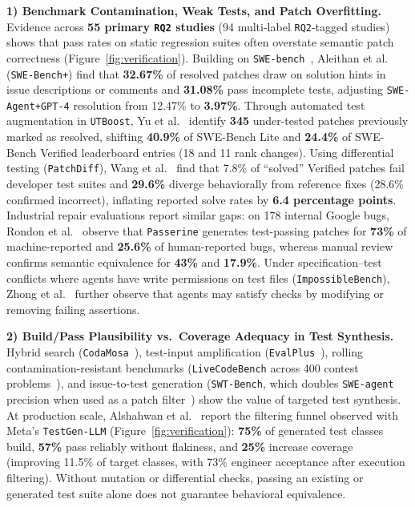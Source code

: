 \documentclass[10pt,twocolumn,a4paper]{article}
\begin{document}
\textbf{1) Benchmark Contamination, Weak Tests, and Patch Overfitting.} Evidence across \textbf{55 primary \texttt{RQ2} studies} (94 multi-label \texttt{RQ2}-tagged studies) shows that pass rates on static regression suites often overstate semantic patch correctness (Figure~\ref{fig:verification}). Building on \texttt{SWE-bench}~\cite{jimenez2024swebench}, Aleithan et al.~\cite{aleithan2026swebench} (\texttt{SWE-Bench+}) find that \textbf{32.67\%} of resolved patches draw on solution hints in issue descriptions or comments and \textbf{31.08\%} pass incomplete tests, adjusting \texttt{SWE-Agent+GPT-4} resolution from 12.47\% to \textbf{3.97\%}. Through automated test augmentation in \texttt{UTBoost}, Yu et al.~\cite{yu2025utboost} identify \textbf{345} under-tested patches previously marked as resolved, shifting \textbf{40.9\%} of SWE-Bench Lite and \textbf{24.4\%} of SWE-Bench Verified leaderboard entries (18 and 11 rank changes). Using differential testing (\texttt{PatchDiff}), Wang et al.~\cite{wang2025solved} find that 7.8\% of ``solved'' Verified patches fail developer test suites and \textbf{29.6\%} diverge behaviorally from reference fixes (28.6\% confirmed incorrect), inflating reported solve rates by \textbf{6.4 percentage points}. Industrial repair evaluations report similar gaps: on 178 internal Google bugs, Rondon et al.~\cite{rondon2025evaluating} observe that \texttt{Passerine} generates test-passing patches for \textbf{73\%} of machine-reported and \textbf{25.6\%} of human-reported bugs, whereas manual review confirms semantic equivalence for \textbf{43\%} and \textbf{17.9\%}. Under specification--test conflicts where agents have write permissions on test files (\texttt{ImpossibleBench}), Zhong et al.~\cite{zhong2025impossiblebench} further observe that agents may satisfy checks by modifying or removing failing assertions.

\textbf{2) Build/Pass Plausibility vs.\ Coverage Adequacy in Test Synthesis.} Hybrid search (\texttt{CodaMosa}~\cite{lemieux2023codamosa}), test-input amplification (\texttt{EvalPlus}~\cite{liu2023your}), rolling contamination-resistant benchmarks (\texttt{LiveCodeBench} across 400 contest problems~\cite{jain2025livecodebench}), and issue-to-test generation (\texttt{SWT-Bench}, which doubles \texttt{SWE-agent} precision when used as a patch filter~\cite{mndlersasahara2024swtbench}) show the value of targeted test synthesis. At production scale, Alshahwan et al.~\cite{alshahwan2024automated} report the filtering funnel observed with Meta's \texttt{TestGen-LLM} (Figure~\ref{fig:verification}): \textbf{75\%} of generated test classes build, \textbf{57\%} pass reliably without flakiness, and \textbf{25\%} increase coverage (improving 11.5\% of target classes, with 73\% engineer acceptance after execution filtering). Without mutation or differential checks, passing an existing or generated test suite alone does not guarantee behavioral equivalence.
\end{document}
